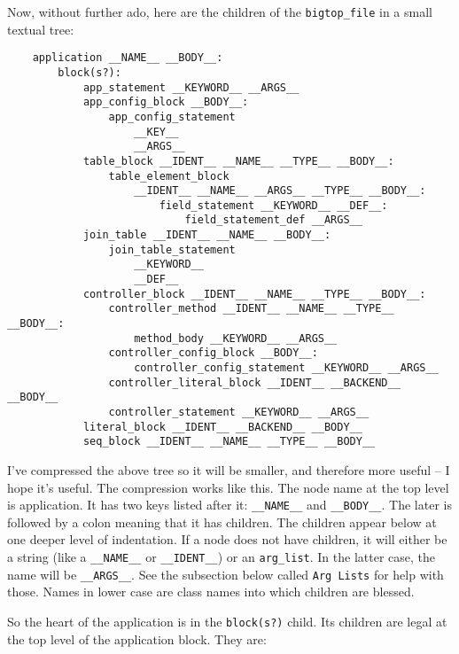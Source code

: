 Now, without further ado, here are the children of the \verb+bigtop_file+ in
a small textual tree:

\begin{verbatim}
    application __NAME__ __BODY__:
        block(s?):
            app_statement __KEYWORD__ __ARGS__ 
            app_config_block __BODY__:
                app_config_statement
                    __KEY__
                    __ARGS__
            table_block __IDENT__ __NAME__ __TYPE__ __BODY__:
                table_element_block
                    __IDENT__ __NAME__ __ARGS__ __TYPE__ __BODY__:
                        field_statement __KEYWORD__ __DEF__:
                            field_statement_def __ARGS__
            join_table __IDENT__ __NAME__ __BODY__:
                join_table_statement
                    __KEYWORD__
                    __DEF__
            controller_block __IDENT__ __NAME__ __TYPE__ __BODY__:
                controller_method __IDENT__ __NAME__ __TYPE__ __BODY__:
                    method_body __KEYWORD__ __ARGS__
                controller_config_block __BODY__:
                    controller_config_statement __KEYWORD__ __ARGS__
                controller_literal_block __IDENT__ __BACKEND__ __BODY__
                controller_statement __KEYWORD__ __ARGS__
            literal_block __IDENT__ __BACKEND__ __BODY__
            seq_block __IDENT__ __NAME__ __TYPE__ __BODY__
\end{verbatim}

I've compressed the above tree so it will be smaller, and therefore more
useful -- I hope it's useful.  The compression works like this.  The
node name at the top level is application.  It has two keys listed
after it: \verb+__NAME__+ and \verb+__BODY__+.  The later is followed by
a colon meaning that it has children.  The children appear below at
one deeper level of indentation.  If a node does not have children, it
will either be a string (like a \verb+__NAME__+ or \verb+__IDENT__+) or
an \verb+arg_list+.  In the latter case, the name will be \verb+__ARGS__+.
See the subsection below called \verb+Arg Lists+ for help with those.
Names in lower case are class names into which children are blessed.

So the heart of the application is in the \verb+block(s?)+ child.
Its children are legal at the top level of the application block.  They
are:

